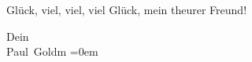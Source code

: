 \pstart
           Glück, viel, viel, viel Glück, mein theurer Freund!\pend
           
\pstart
           Dein {\\[\baselineskip]}\spacefill\mbox{Paul Goldm\textcolor{gray}{{\geminationn}}}\pend
           \leftskip=0em{}\endnumbering{}  \newcommand{\dateiname}{L02749}\newcommand{\titel}{Paul Goldmann an Arthur Schnitzler, 6. 10. [1895]}\newcommand{\editorInnen}{Martin Anton Müller und Laura Untner}
